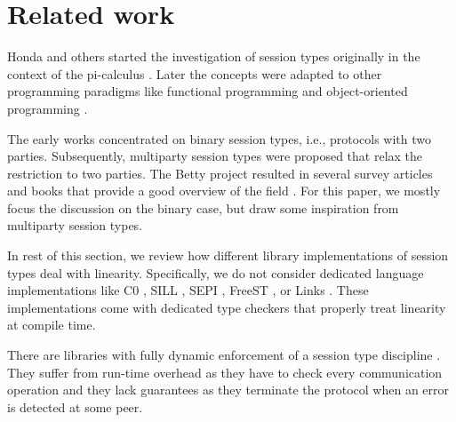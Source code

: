 \documentclass[acmsmall,screen]{acmart}
\begin{document}
\section{Related work}
\label{sec:related-work}

Honda and others
\cite{DBLP:conf/concur/Honda93,DBLP:conf/parle/TakeuchiHK94,DBLP:conf/esop/HondaVK98}
started the investigation of session types originally in the context
of the pi-calculus \cite{DBLP:journals/iandc/MilnerPW92a}. Later the concepts were adapted to other programming
paradigms like functional programming
\cite{DBLP:journals/tcs/VasconcelosGR06,DBLP:journals/jfp/GayV10} and
object-oriented programming
\cite{DBLP:conf/europar/RavaraV97,DBLP:journals/corr/abs-1205-5344}. 

The early works concentrated on binary session types, i.e., protocols
with two parties. Subsequently, multiparty session types were
proposed \cite{DBLP:journals/jacm/HondaYC16} that relax the
restriction to two parties. The Betty project resulted in several survey articles
and books that provide a good overview of the field
\cite{gay17:_behav_types,DBLP:journals/csur/HuttelLVCCDMPRT16,DBLP:journals/jlp/BartolettiCDDGP15,DBLP:journals/ftpl/AnconaBB0CDGGGH16}. 
For this paper, we mostly focus the discussion on the binary case, but draw some
inspiration from multiparty session types.



In rest of this section, we review how different library implementations of
session types deal with linearity. Specifically, we do not consider
dedicated language implementations like
C0 \cite{DBLP:journals/corr/WillseyPP17},
SILL \cite{DBLP:conf/esop/ToninhoCP13},
SEPI \cite{DBLP:conf/sefm/FrancoV13},
FreeST \cite{DBLP:journals/iandc/AlmeidaMTV22},
or Links \cite{lindley17:_light_funct_session_types}. These
implementations come with dedicated type checkers that properly treat
linearity at compile time.





There are libraries with fully dynamic enforcement of a session type
discipline
\cite{DBLP:conf/rv/HuNYDH13,DBLP:journals/pacmpl/MelgrattiP17}. They
suffer from run-time overhead as they have to check every
communication operation and they lack guarantees as they terminate the
protocol when an error is detected at some peer. 
\end{document}
